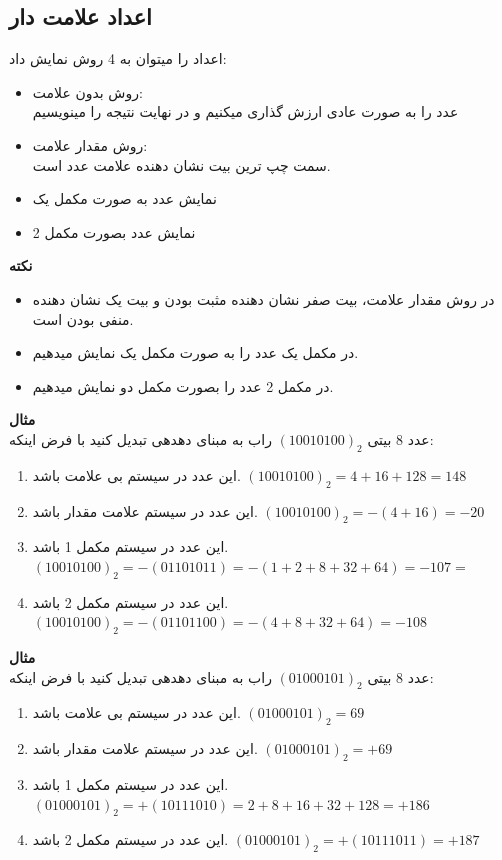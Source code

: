 \documentclass[pt, a5paper]{article}
\begin{document}
\subsection{اعداد علامت دار}
اعداد را میتوان به 4 روش نمایش داد:\\

\begin{itemize}\raggedleft
	\item
	روش بدون علامت:\\
	عدد را به صورت عادی ارزش گذاری میکنیم و در نهایت نتیجه را مینویسیم
	\item
	روش مقدار علامت:\\
	سمت چپ ترین بیت نشان دهنده علامت عدد است.
	\item
	نمایش عدد به صورت مکمل یک
	\item
	نمایش عدد بصورت مکمل 2
\end{itemize}

\textbf{نکته}\\
\begin{itemize}\raggedleft
	\item
	در روش مقدار علامت، بیت صفر نشان دهنده مثبت بودن و بیت یک نشان دهنده منفی بودن است.
	\item
در مکمل یک عدد را به صورت مکمل یک نمایش میدهیم.
	\item
در مکمل 2 عدد را بصورت مکمل دو نمایش میدهیم.
\end{itemize}

\textbf{مثال}\\
عدد 8 بیتی
$(10010100)_{2}$
راب به مبنای دهدهی تبدیل کنید با فرض اینکه:\\

\begin{enumerate}\raggedleft
	\item
		این عدد در سیستم بی علامت باشد.
		$(10010100)_{2} = 4+16+128 = 148$
	\item
	این عدد در سیستم علامت مقدار باشد.
	$(10010100)_{2} = -(4+16) = -20$
	\item
	این عدد در سیستم مکمل 1 باشد.
	$(10010100)_{2} = -(01101011) = -(1+2+8+32+64)= -107 = $
	\item
	این عدد در سیستم مکمل 2 باشد.
	$(10010100)_{2} = -(01101100) = -(4+8+32+64) = -108 $
\end{enumerate}


\textbf{مثال}\\
عدد 8 بیتی
$(01000101)_{2}$
راب به مبنای دهدهی تبدیل کنید با فرض اینکه:\\

\begin{enumerate}\raggedleft
	\item
		این عدد در سیستم بی علامت باشد.
		$(01000101)_{2} = 69$
	\item
	این عدد در سیستم علامت مقدار باشد.
	$(01000101)_{2} = +69$
	\item
	این عدد در سیستم مکمل 1 باشد.
	$(01000101)_{2} = +(10111010) = 2+8+16+32+128 = +186$
	\item
	این عدد در سیستم مکمل 2 باشد.
	$(01000101)_{2} = +(10111011) = +187 $
\end{enumerate}
\end{document}
